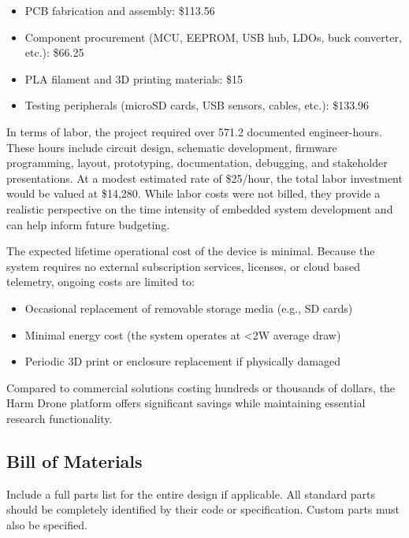 \documentclass[12pt]{article}
\begin{document}
\begin{itemize}
\item PCB fabrication and assembly: \$113.56
\item Component procurement (MCU, EEPROM, USB hub, LDOs, buck converter, etc.): \$66.25
\item PLA filament and 3D printing materials: \$15
\item Testing peripherals (microSD cards, USB sensors, cables, etc.): \$133.96
\end{itemize}

\par In terms of labor, the project required over 571.2 documented engineer-hours. These hours include circuit design, schematic development, firmware programming, layout, prototyping, documentation, debugging, and stakeholder presentations. At a modest estimated rate of \$25/hour, the total labor investment would be valued at \$14,280. While labor costs were not billed, they provide a realistic perspective on the time intensity of embedded system development and can help inform future budgeting.

\par The expected lifetime operational cost of the device is minimal. Because the system requires no external subscription services, licenses, or cloud based telemetry, ongoing costs are limited to:

\begin{itemize}
\item Occasional replacement of removable storage media (e.g., SD cards)
\item Minimal energy cost (the system operates at \textless 2W average draw)
\item Periodic 3D print or enclosure replacement if physically damaged
\end{itemize}

\par Compared to commercial solutions costing hundreds or thousands of dollars, the Harm Drone platform offers significant savings while maintaining essential research functionality.

\subsection{Bill of Materials}
Include a full parts list for the entire design if applicable. All standard parts should be completely identified by their code or specification. Custom parts must also be specified.
\end{document}
